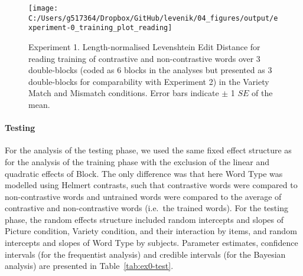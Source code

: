 \documentclass[doc,floatsintext]{apa6}
\let\oldparagraph\paragraph
\renewcommand{\paragraph}[1]{\oldparagraph{#1}\mbox{}}
\begin{document}
\begin{figure}[H]

{\centering \texttt{[image: C:/Users/g517364/Dropbox/GitHub/levenik/04\_figures/output/experiment-0\_training\_plot\_reading]} 

}

\caption{Experiment 1. Length-normalised Levenshtein Edit Distance for reading training of contrastive and non-contrastive words over 3 double-blocks (coded as 6 blocks in the analyses but presented as 3 double-blocks for comparability with Experiment 2) in the Variety Match and Mismatch conditions. Error bars indicate $\pm$ 1 $SE$ of the mean.}\label{fig:ex0-train-plots}
\end{figure}

\paragraph{Testing}\label{testing}

For the analysis of the testing phase, we used the same fixed effect
structure as for the analysis of the training phase with the exclusion
of the linear and quadratic effects of Block. The only difference was
that here Word Type was modelled using Helmert contrasts, such that
contrastive words were compared to non-contrastive words and untrained
words were compared to the average of contrastive and non-contrastive
words (i.e.~the trained words). For the testing phase, the random
effects structure included random intercepts and slopes of Picture
condition, Variety condition, and their interaction by items, and random
intercepts and slopes of Word Type by subjects. Parameter estimates,
confidence intervals (for the frequentist analysis) and credible
intervals (for the Bayesian analysis) are presented in
Table~\ref{tab:ex0-test}.

\newpage
\end{document}
